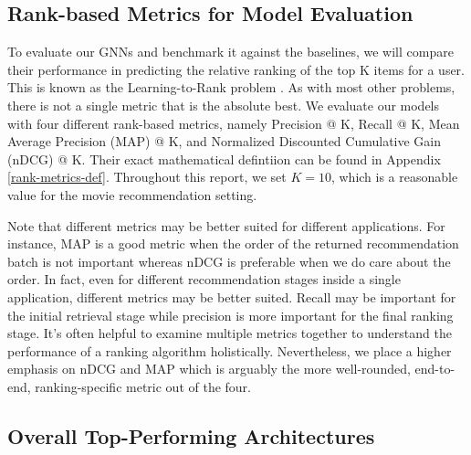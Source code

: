 \documentclass{article}
\begin{document}

\subsection{Rank-based Metrics for Model Evaluation} \label{metrics}


To evaluate our GNNs and benchmark it against the baselines, we will compare their performance in predicting the relative ranking of the top K items for a user. This is known as the Learning-to-Rank problem \cite{learning_to_rank}. As with most other problems, there is not a single metric that is the absolute best. We evaluate our models with four different rank-based metrics, namely Precision @ K, Recall @ K, Mean Average Precision (MAP) @ K, and Normalized Discounted Cumulative Gain (nDCG) @ K. Their exact mathematical defintiion can be found in Appendix \ref{rank-metrics-def}. Throughout this report, we set $K = 10$, which is a reasonable value for the movie recommendation setting.

Note that different metrics may be better suited for different applications. For instance, MAP is a good metric when the order of the returned recommendation batch is not important whereas nDCG is preferable when we do care about the order. In fact, even for different recommendation stages inside a single application, different metrics may be better suited. Recall may be important for the initial retrieval stage while precision is more important for the final ranking stage. It's often helpful to examine multiple metrics together to understand the performance of a ranking algorithm holistically. Nevertheless, we place a higher emphasis on nDCG and MAP which is arguably the more well-rounded, end-to-end, ranking-specific metric out of the four.

\subsection{Overall Top-Performing Architectures} \label{sec:overall-architecture-results}
\end{document}
